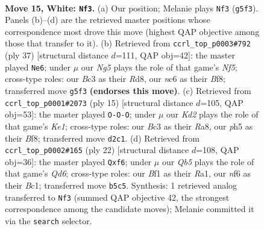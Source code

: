 \documentclass[11pt]{article}
\begin{document}
\clearpage

\begin{figure}[p]\centering
\begin{subfigure}{0.46\textwidth}\centering
\resizebox{\linewidth}{!}{%
\newchessgame
\chessboard[
  setfen={r1b2r2/p1ppqpp1/2n1pn1k/1Qp3Np/3P4/2B3P1/PP1KPP1P/R4B1R w - - 2 15},
  showmover=false,
  pgfstyle=straightmove, color=movearrow, markmove={g5-f3}
]}
\caption{}
\end{subfigure}\hfill
\begin{subfigure}{0.46\textwidth}\centering
\resizebox{\linewidth}{!}{%
\newchessgame
\chessboard[
  setfen={1k1r1b1r/pp1q2pp/3p1n2/2p5/2N2n2/N1P2R1P/PPQ2PP1/R1B3K1 b - - 14 19},
  showmover=false,
  pgfstyle=straightmove, color=movearrow, markmove={f4-e6}
]}
\caption{}
\end{subfigure}
\\[4pt]
\begin{subfigure}{0.46\textwidth}\centering
\resizebox{\linewidth}{!}{%
\newchessgame
\chessboard[
  setfen={r3kbnr/ppp2ppp/2n1p3/3p4/2PP4/2N2NPq/PP2PP1P/R1BQ1RK1 b kq - 1 8},
  showmover=false,
  pgfstyle=straightmove, color=movearrow, markmove={e8-c8}
]}
\caption{}
\end{subfigure}\hfill
\begin{subfigure}{0.46\textwidth}\centering
\resizebox{\linewidth}{!}{%
\newchessgame
\chessboard[
  setfen={r1b1k2r/1p1n1ppp/2pQ1qn1/p3p3/2P1P3/P1N5/1P3PPP/R1B1KB1R w KQkq - 4 12},
  showmover=false,
  pgfstyle=straightmove, color=movearrow, markmove={d6-f6}
]}
\caption{}
\end{subfigure}
\caption{\textbf{Move 15, White: \texttt{Nf3}.} (a) Our position; Melanie plays \texttt{Nf3} (\texttt{g5f3}). Panels (b)--(d) are the retrieved master positions whose correspondence most drove this move (highest QAP objective among those that transfer to it). (b) Retrieved from \texttt{ccrl\_top\_p0003\#792} (ply 37) [structural distance $d$=111, QAP obj=42]: the master played \texttt{Ne6}; under $\mu$ our \emph{Ng5} plays the role of that game's \emph{Nf5}; cross-type roles: our \emph{B}c3 as their \emph{R}d8, our \emph{n}c6 as their \emph{B}f8; transferred move \texttt{g5f3} \textbf{(endorses this move)}. (c) Retrieved from \texttt{ccrl\_top\_p0001\#2073} (ply 15) [structural distance $d$=105, QAP obj=53]: the master played \texttt{O-O-O}; under $\mu$ our \emph{Kd2} plays the role of that game's \emph{Ke1}; cross-type roles: our \emph{B}c3 as their \emph{R}a8, our \emph{p}h5 as their \emph{B}f8; transferred move \texttt{d2c1}. (d) Retrieved from \texttt{ccrl\_top\_p0002\#165} (ply 22) [structural distance $d$=108, QAP obj=36]: the master played \texttt{Qxf6}; under $\mu$ our \emph{Qb5} plays the role of that game's \emph{Qd6}; cross-type roles: our \emph{B}f1 as their \emph{R}a1, our \emph{n}f6 as their \emph{B}c1; transferred move \texttt{b5c5}. Synthesis: 1 retrieved analog transferred to \texttt{Nf3} (summed QAP objective 42, the strongest correspondence among the candidate moves); Melanie committed it via the \texttt{search} selector.}
\label{fig:thought-m28}
\end{figure}
\end{document}
